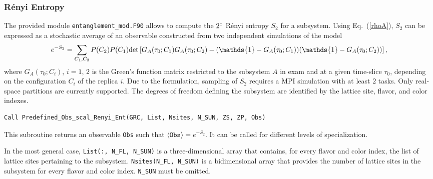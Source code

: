 %
\subsubsection{R{\'e}nyi Entropy}
\label{sec:renyi}
The provided module \texttt{entanglement\_mod.F90} allows to compute the $2^{\rm o}$ R\'enyi entropy $S_2$ for a subsystem.
Using Eq.~(\ref{rhoA}), $S_2$ can be expressed as a stochastic average of an observable constructed from two independent simulations of the model \cite{Grover13}
\begin{equation}
e^{-S_2} = \sum_{C_1,C_2} P(C_2) P(C_1) {\rm det}\left[G_A(\tau_0; C_1)G_A(\tau_0; C_2)-(\mathds{1} - G_A(\tau_0; C_1))(\mathds{1} - G_A(\tau_0; C_2))\right],
\label{renyi_obs}
\end{equation}
where $G_A(\tau_0; C_i)$, $i=1$, $2$ is the Green's function matrix restricted to the subsystem $A$ in exam and at a given time-slice $\tau_0$, depending on the configuration $C_i$ of the replica $i$.
Due to the formulation, sampling of $S_2$ requires a MPI simulation with at least $2$ tasks.
Only real-space partitions are currently supported.
The degrees of freedom defining the subsystem are identified by the lattice site, flavor, and color indexes.

\begin{lstlisting}[style=fortran]
Call Predefined_Obs_scal_Renyi_Ent(GRC, List, Nsites, N_SUN, ZS, ZP, Obs)
\end{lstlisting}
This subroutine returns an observable \texttt{Obs} such that $\langle\texttt{Obs}\rangle=e^{-S_2}$.
It can be called for different levels of specialization.

In the most general case, \texttt{List(:, N\_FL, N\_SUN)} is a three-dimensional array that contains, for every flavor and color index, the list of lattice sites pertaining to the subsystem. \texttt{Nsites(N\_FL, N\_SUN)} is a bidimensional array that provides the number of lattice sites in the subsystem for every flavor and color index. \texttt{N\_SUN} must be omitted.

